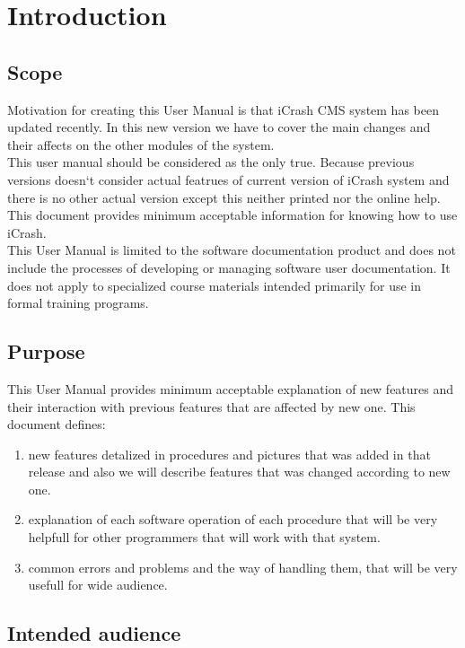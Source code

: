 \chapter{Introduction}
\label{chap:introduction}

\section{Scope}

Motivation for creating this User Manual is that iCrash CMS system has been
updated recently. In this new version we have to cover the main changes and
their affects on the other modules of the system. \\
This user manual should be considered as the only true. Because previous
versions doesn`t consider actual featrues of current version of iCrash system
and there is no other actual version except this neither printed nor the online
help. This document provides minimum acceptable information for knowing how to
use iCrash. \\
This User Manual is limited to the software documentation product and does not
include the processes of developing or managing software user documentation. It does not apply to specialized course materials
intended primarily for use in formal training programs. \\

\section{Purpose}

This User Manual provides minimum acceptable explanation of new
features and their interaction with previous features that are affected by new
one. This document defines:
\begin{enumerate}
  	\item new features detalized in procedures and pictures that
was added in that release and also we will describe features that was changed according to new one. 
	\item explanation of each software operation of each procedure that will be
very helpfull for other programmers that will work with that system.
	\item common errors and problems and the way of handling them, that
will be very usefull for wide audience. 
\end{enumerate} 

\section{Intended audience}

